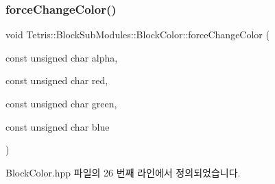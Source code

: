 \subsubsection{\texorpdfstring{force\+Change\+Color()}{forceChangeColor()}}
{\footnotesize\ttfamily void Tetris\+::\+Block\+Sub\+Modules\+::\+Block\+Color\+::force\+Change\+Color (\begin{DoxyParamCaption}\item[{const unsigned char}]{alpha,  }\item[{const unsigned char}]{red,  }\item[{const unsigned char}]{green,  }\item[{const unsigned char}]{blue }\end{DoxyParamCaption})\hspace{0.3cm}{\ttfamily [inline]}}



Block\+Color.\+hpp 파일의 26 번째 라인에서 정의되었습니다.


